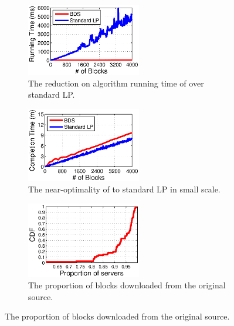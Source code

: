 \begin{figure}[t]
        \centering
        \begin{subfigure}[b]{0.3\textwidth}
                \centering
                \includegraphics[width=50mm]{images/BDSvsLP.eps} %
                \caption{The reduction on algorithm running time of \name over standard LP.}
                \label{fig:further:BDSvsLP}
        \end{subfigure}
        \begin{subfigure}[b]{0.3\textwidth}
                \centering
                \includegraphics[width=50mm]{images/BDSvsLP_CT.eps}%
                \caption{The near-optimality of \name to standard LP in small scale.}
                \label{fig:further:BDSvsLP_CT}
        \end{subfigure}
        \begin{subfigure}[b]{0.3\textwidth}
                \centering
                \includegraphics[width=50mm]{images/overlay.eps}
                \caption{The proportion of blocks downloaded from the original source.}
                \label{fig:further:overlay}
        \end{subfigure}
        \label{fig:further}
\vspace{-0.4cm}
\end{figure}

